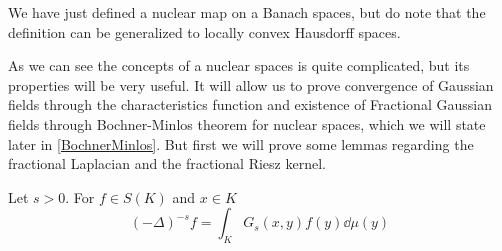 \begin{remark*}
	We have just defined a nuclear map on a Banach spaces, but do note that the definition can be generalized to locally convex Hausdorff spaces.
\end{remark*}
As we can see the concepts of a nuclear spaces is quite complicated, but its properties will be very useful. It will allow us to prove convergence of Gaussian fields through the characteristics function and existence of Fractional Gaussian fields through Bochner-Minlos theorem for nuclear spaces, which we will state later in \cref{BochnerMinlos}. But first we will prove some lemmas regarding the fractional Laplacian and the fractional Riesz kernel.
\begin{lemma}\label{fractionalLaplacianIsRieszKernel}
	Let $s > 0$. For $f \in S(K)$ and $x \in K$
	\begin{equation}
		(-\Delta)^{-s}f = \int_{K}G_s(x,y)f(y) \dd \mu(y)
	\end{equation}
\end{lemma}
